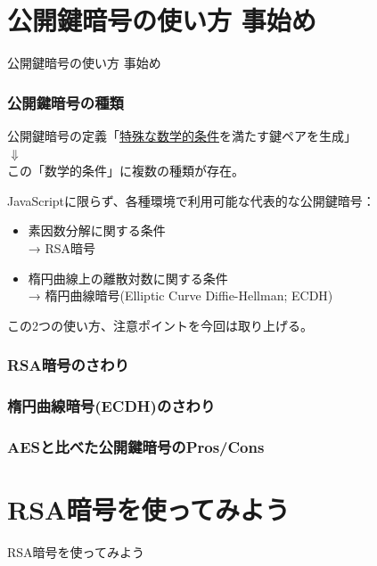 \documentclass[12pt,dvipdfmx]{beamer}
\begin{document}
\section{公開鍵暗号の使い方 事始め}
\begin{frame}
\centering
{\Large 公開鍵暗号の使い方 事始め}
\end{frame}

\begin{frame}
\frametitle{公開鍵暗号の種類}
\begin{exampleblock}{}
\begin{center}
公開鍵暗号の定義「\underline{特殊な数学的条件}を満たす鍵ペアを生成」\\[0.5ex]
 $\Downarrow$\\[0.5ex]
この「数学的条件」に複数の種類が存在。
\end{center}
\end{exampleblock}

\vspace{2ex}

JavaScriptに限らず、各種環境で利用可能な代表的な公開鍵暗号：
\begin{itemize}
 \item 素因数分解に関する条件\\ → \alert{RSA暗号}
 \item 楕円曲線上の離散対数に関する条件\\ → \alert{楕円曲線暗号(Elliptic Curve Diffie-Hellman; ECDH)}
\end{itemize}
この2つの使い方、注意ポイントを今回は取り上げる。
\end{frame}

\begin{frame}
\frametitle{RSA暗号のさわり}
\end{frame}

\begin{frame}
\frametitle{楕円曲線暗号(ECDH)のさわり}
\end{frame}

\begin{frame}
\frametitle{AESと比べた公開鍵暗号のPros/Cons}
\end{frame}

\section{RSA暗号を使ってみよう}
\begin{frame}
\centering
{\Large RSA暗号を使ってみよう}
\end{frame}
\end{document}
